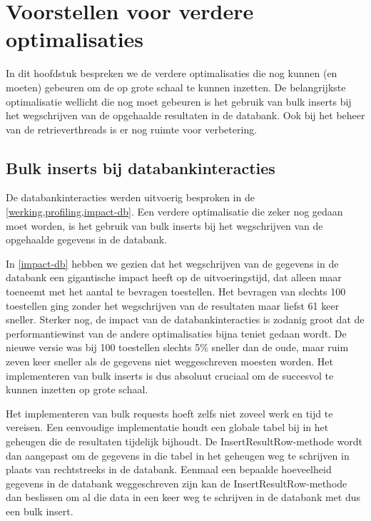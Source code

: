 \chapter{Voorstellen voor verdere optimalisaties}

In dit hoofdstuk bespreken we de verdere optimalisaties die nog kunnen (en moeten) gebeuren om de \nwmretriever{} op grote schaal te kunnen inzetten.
De belangrijkste optimalisatie wellicht die nog moet gebeuren is het gebruik van bulk inserts bij het wegschrijven van de opgehaalde resultaten in de databank.
Ook bij het beheer van de retrieverthreads is er nog ruimte voor verbetering.


\section{Bulk inserts bij databankinteracties}

De databankinteracties werden uitvoerig besproken in de \cref{werking,profiling,impact-db}.
Een verdere optimalisatie die zeker nog gedaan moet worden,
is het gebruik van bulk inserts bij het wegschrijven van de opgehaalde gegevens in de databank.

In \cref{impact-db} hebben we gezien dat het wegschrijven van de gegevens in de databank een gigantische impact heeft op de uitvoeringstijd,
dat alleen maar toeneemt met het aantal te bevragen toestellen.
Het bevragen van slechts 100 toestellen ging zonder het wegschrijven van de resultaten maar liefst 61 keer sneller.
Sterker nog, de impact van de databankinteracties is zodanig groot dat de performantiewinst van de andere optimalisaties bijna teniet gedaan wordt.
De nieuwe versie was bij 100 toestellen slechts 5\% sneller dan de oude, maar ruim zeven keer sneller als de gegevens niet weggeschreven moesten worden.
Het implementeren van bulk inserts is dus absoluut cruciaal om de \nwmretriever{} succesvol te kunnen inzetten op grote schaal.

Het implementeren van bulk requests hoeft zelfs niet zoveel werk en tijd te vereisen.
Een eenvoudige implementatie houdt een globale tabel bij in het geheugen die de resultaten tijdelijk bijhoudt.
De InsertResultRow-methode wordt dan aangepast om de gegevens in die tabel in het geheugen weg te schrijven in plaats van rechtstreeks in de databank.
Eenmaal een bepaalde hoeveelheid gegevens in de databank weggeschreven zijn kan de InsertResultRow-methode dan beslissen om al die data
in een keer weg te schrijven in de databank met dus een bulk insert.

